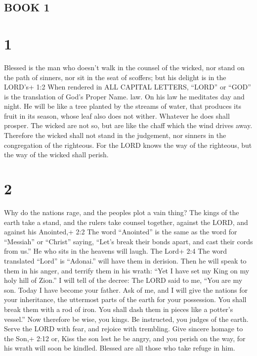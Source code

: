 \hypertarget{book-1}{%
\subsection{BOOK 1}\label{book-1}}

\hypertarget{section}{%
\section{1}\label{section}}

 Blessed is the man who doesn't walk in the counsel of the
wicked, nor stand on the path of sinners, nor sit in the seat of
scoffers;  but his delight is in the LORD's+ 1:2 When
rendered in ALL CAPITAL LETTERS, ``LORD'' or ``GOD'' is the translation
of God's Proper Name. law. On his law he meditates day and night.
 He will be like a tree planted by the streams of water,
that produces its fruit in its season, whose leaf also does not wither.
Whatever he does shall prosper.  The wicked are not so, but
are like the chaff which the wind drives away.  Therefore
the wicked shall not stand in the judgement, nor sinners in the
congregation of the righteous.  For the LORD knows the way
of the righteous, but the way of the wicked shall perish.

\hypertarget{section-1}{%
\section{2}\label{section-1}}

 Why do the nations rage, and the peoples plot a vain thing?
 The kings of the earth take a stand, and the rulers take
counsel together, against the LORD, and against his Anointed,+ 2:2 The
word ``Anointed'' is the same as the word for ``Messiah'' or ``Christ''
saying,  ``Let's break their bonds apart, and cast their
cords from us.''  He who sits in the heavens will laugh. The
Lord+ 2:4 The word translated ``Lord'' is ``Adonai.'' will have them in
derision.  Then he will speak to them in his anger, and
terrify them in his wrath:  ``Yet I have set my King on my
holy hill of Zion.''  I will tell of the decree: The LORD
said to me, ``You are my son. Today I have become your father.
 Ask of me, and I will give the nations for your
inheritance, the uttermost parts of the earth for your possession.
 You shall break them with a rod of iron. You shall dash
them in pieces like a potter's vessel.''  Now therefore be
wise, you kings. Be instructed, you judges of the earth. 
Serve the LORD with fear, and rejoice with trembling.  Give
sincere homage to the Son,+ 2:12 or, Kiss the son lest he be angry, and
you perish on the way, for his wrath will soon be kindled. Blessed are
all those who take refuge in him.

